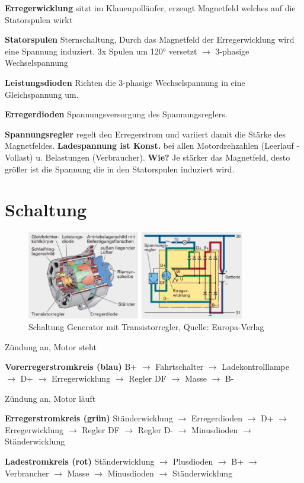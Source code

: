 \textbf{Erregerwicklung} sitzt im Klauenpolläufer, erzeugt Magnetfeld
welches auf die Statorspulen wirkt

\textbf{Statorspulen} Sternschaltung, Durch das Magnetfeld der
Erregerwicklung wird eine Spannung induziert. 3x Spulen um 120° versetzt
$\to$ 3-phasige Wechselspannung

\textbf{Leistungsdioden} Richten die 3-phasige Wechselspannung in eine
Gleichspannung um.

\textbf{Erregerdioden} Spannungsversorgung des Spannungsreglers.

\textbf{Spannungsregler} regelt den Erregerstrom und variiert damit die
Stärke des Magnetfeldes. \textbf{Ladespannung ist Konst.} bei allen
Motordrehzahlen (Leerlauf - Vollast) u. Belastungen (Verbraucher).
\textbf{Wie?} Je stärker das Magnetfeld, desto größer ist die Spannung
die in den Statorspulen induziert wird.

\newpage

\section{Schaltung}\label{schaltung}

\begin{figure}[!ht]%
\centering
\includegraphics[width=0.85\textwidth]{images/Generator/Generator-9.pdf}
\caption{Schaltung Generator mit Transistorregler, Quelle:
Europa-Verlag}
\end{figure}

Zündung an, Motor steht

\textbf{Vorerregerstromkreis (blau)} B+ $\to$ Fahrtschalter $\to$
Ladekontrolllampe $\to$ D+ $\to$ Erregerwicklung $\to$ Regler DF
$\to$ Masse $\to$ B-

Zündung an, Motor läuft

\textbf{Erregerstromkreis (grün)} Ständerwicklung $\to$ Erregerdioden
$\to$ D+ $\to$ Erregerwicklung $\to$ Regler DF $\to$ Regler D-
$\to$ Minusdioden $\to$ Ständerwicklung

\textbf{Ladestromkreis (rot)} Ständerwicklung $\to$ Plusdioden $\to$
B+ $\to$ Verbraucher $\to$ Masse $\to$ Minusdioden $\to$
Ständerwicklung

